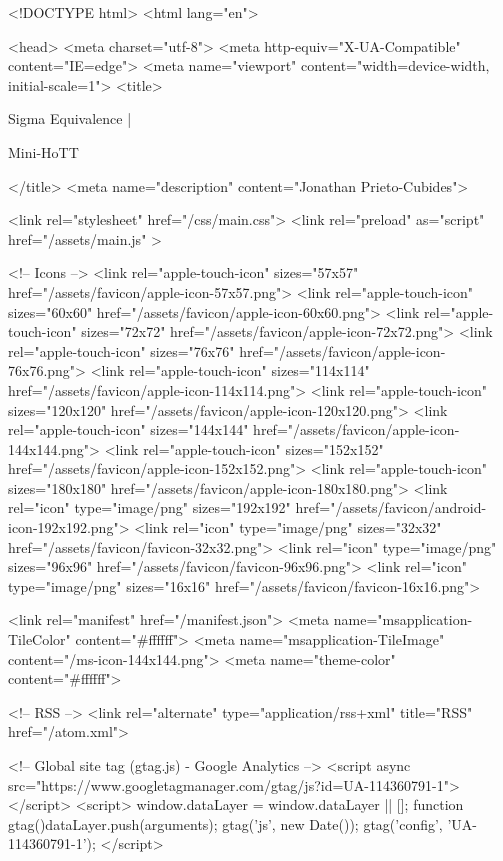 <!DOCTYPE html>
<html lang="en">

<head>
  <meta charset="utf-8">
  <meta http-equiv="X-UA-Compatible" content="IE=edge">
  <meta name="viewport" content="width=device-width, initial-scale=1">
  <title>
    
      
        Sigma Equivalence |
      
        Mini-HoTT
    
  </title>
  <meta name="description" content="Jonathan Prieto-Cubides">

  <link rel="stylesheet" href="/css/main.css">
  <link rel="preload" as="script" href="/assets/main.js" >

  <!-- Icons -->
  <link rel="apple-touch-icon" sizes="57x57" href="/assets/favicon/apple-icon-57x57.png">
  <link rel="apple-touch-icon" sizes="60x60" href="/assets/favicon/apple-icon-60x60.png">
  <link rel="apple-touch-icon" sizes="72x72" href="/assets/favicon/apple-icon-72x72.png">
  <link rel="apple-touch-icon" sizes="76x76" href="/assets/favicon/apple-icon-76x76.png">
  <link rel="apple-touch-icon" sizes="114x114" href="/assets/favicon/apple-icon-114x114.png">
  <link rel="apple-touch-icon" sizes="120x120" href="/assets/favicon/apple-icon-120x120.png">
  <link rel="apple-touch-icon" sizes="144x144" href="/assets/favicon/apple-icon-144x144.png">
  <link rel="apple-touch-icon" sizes="152x152" href="/assets/favicon/apple-icon-152x152.png">
  <link rel="apple-touch-icon" sizes="180x180" href="/assets/favicon/apple-icon-180x180.png">
  <link rel="icon" type="image/png" sizes="192x192"  href="/assets/favicon/android-icon-192x192.png">
  <link rel="icon" type="image/png" sizes="32x32" href="/assets/favicon/favicon-32x32.png">
  <link rel="icon" type="image/png" sizes="96x96" href="/assets/favicon/favicon-96x96.png">
  <link rel="icon" type="image/png" sizes="16x16" href="/assets/favicon/favicon-16x16.png">

  <link rel="manifest" href="/manifest.json">
  <meta name="msapplication-TileColor" content="#ffffff">
  <meta name="msapplication-TileImage" content="/ms-icon-144x144.png">
  <meta name="theme-color" content="#ffffff">

  <!-- RSS -->
  <link rel="alternate" type="application/rss+xml" title="RSS" href="/atom.xml">

  <!-- Global site tag (gtag.js) - Google Analytics -->
  <script async src="https://www.googletagmanager.com/gtag/js?id=UA-114360791-1"></script>
  <script>
    window.dataLayer = window.dataLayer || [];
    function gtag(){dataLayer.push(arguments);}
    gtag('js', new Date());
    gtag('config', 'UA-114360791-1');
  </script>

